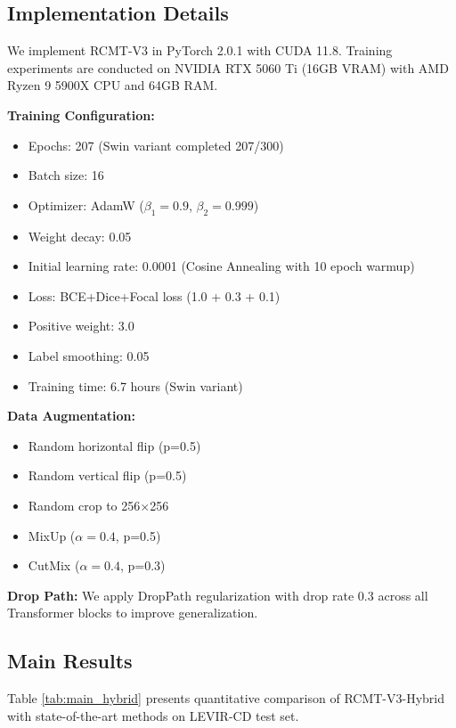 \documentclass[journal]{IEEEtran}
\begin{document}
{\subsection{Implementation Details}

We implement RCMT-V3 in PyTorch 2.0.1 with CUDA 11.8. Training experiments are conducted on NVIDIA RTX 5060 Ti (16GB VRAM) with AMD Ryzen 9 5900X CPU and 64GB RAM.

\textbf{Training Configuration:}
\begin{itemize}
\item Epochs: 207 (Swin variant completed 207/300)
\item Batch size: 16
\item Optimizer: AdamW ($\beta_1=0.9$, $\beta_2=0.999$)
\item Weight decay: 0.05
\item Initial learning rate: 0.0001 (Cosine Annealing with 10 epoch warmup)
\item Loss: BCE+Dice+Focal loss (1.0 + 0.3 + 0.1)
\item Positive weight: 3.0
\item Label smoothing: 0.05
\item Training time: 6.7 hours (Swin variant)
\end{itemize}

\textbf{Data Augmentation:}
\begin{itemize}
\item Random horizontal flip (p=0.5)
\item Random vertical flip (p=0.5)
\item Random crop to 256$\times$256
\item MixUp ($\alpha=0.4$, p=0.5)
\item CutMix ($\alpha=0.4$, p=0.3)
\end{itemize}

\textbf{Drop Path:} We apply DropPath regularization with drop rate 0.3 across all Transformer blocks to improve generalization.

\subsection{Main Results}

Table \ref{tab:main_hybrid} presents quantitative comparison of RCMT-V3-Hybrid with state-of-the-art methods on LEVIR-CD test set.

}
\end{document}
